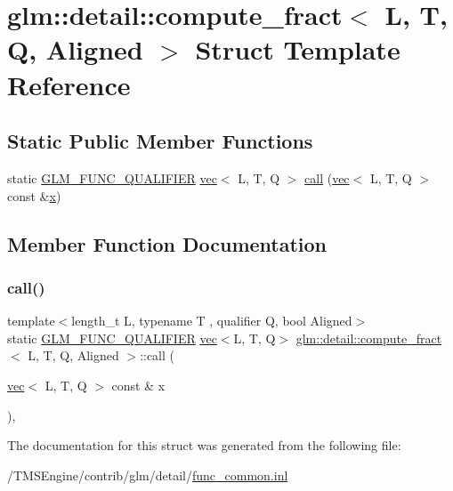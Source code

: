 \hypertarget{structglm_1_1detail_1_1compute__fract}{}\section{glm\+:\+:detail\+:\+:compute\+\_\+fract$<$ L, T, Q, Aligned $>$ Struct Template Reference}
\label{structglm_1_1detail_1_1compute__fract}
\subsection*{Static Public Member Functions}
\begin{DoxyCompactItemize}
\item 
static \hyperlink{setup_8hpp_a33fdea6f91c5f834105f7415e2a64407}{G\+L\+M\+\_\+\+F\+U\+N\+C\+\_\+\+Q\+U\+A\+L\+I\+F\+I\+ER} \hyperlink{structglm_1_1vec}{vec}$<$ L, T, Q $>$ \hyperlink{structglm_1_1detail_1_1compute__fract_a45298051657b230289444a764cc573ad}{call} (\hyperlink{structglm_1_1vec}{vec}$<$ L, T, Q $>$ const \&\hyperlink{_s_d_l__opengl_8h_ad0e63d0edcdbd3d79554076bf309fd47}{x})
\end{DoxyCompactItemize}


\subsection{Member Function Documentation}
\mbox{\label{structglm_1_1detail_1_1compute__fract_a45298051657b230289444a764cc573ad}} 
\subsubsection{\texorpdfstring{call()}{call()}}
{\footnotesize\ttfamily template$<$length\+\_\+t L, typename T , qualifier Q, bool Aligned$>$ \\
static \hyperlink{setup_8hpp_a33fdea6f91c5f834105f7415e2a64407}{G\+L\+M\+\_\+\+F\+U\+N\+C\+\_\+\+Q\+U\+A\+L\+I\+F\+I\+ER} \hyperlink{structglm_1_1vec}{vec}$<$L, T, Q$>$ \hyperlink{structglm_1_1detail_1_1compute__fract}{glm\+::detail\+::compute\+\_\+fract}$<$ L, T, Q, Aligned $>$\+::call (\begin{DoxyParamCaption}\item[{\hyperlink{structglm_1_1vec}{vec}$<$ L, T, Q $>$ const \&}]{x }\end{DoxyParamCaption})\hspace{0.3cm}{\ttfamily [inline]}, {\ttfamily [static]}}



The documentation for this struct was generated from the following file\+:\begin{DoxyCompactItemize}
\item 
/\+T\+M\+S\+Engine/contrib/glm/detail/\hyperlink{func__common_8inl}{func\+\_\+common.\+inl}\end{DoxyCompactItemize}

